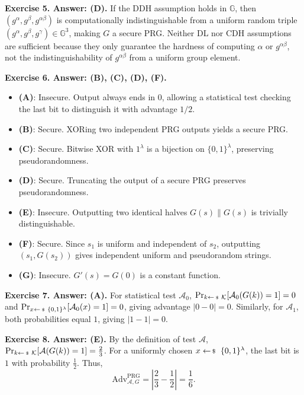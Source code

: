 \documentclass[../../book]{subfiles}
\begin{document}
\textbf{Exercise 5. Answer: (D).} If the DDH assumption holds in $\mathbb{G}$, then $(g^\alpha, g^\beta, g^{\alpha\beta})$ is computationally indistinguishable from a uniform random triple $(g^\alpha, g^\beta, g^\gamma) \in \mathbb{G}^3$, making $G$ a secure PRG. Neither DL nor CDH assumptions are sufficient because they only guarantee the hardness of computing $\alpha$ or $g^{\alpha\beta}$, not the indistinguishability of $g^{\alpha\beta}$ from a uniform group element.

\textbf{Exercise 6. Answer: (B), (C), (D), (F).}
\begin{itemize}
    \item \textbf{(A)}: Insecure. Output always ends in $0$, allowing a statistical test checking the last bit to distinguish it with advantage $1/2$.
    \item \textbf{(B)}: Secure. XORing two independent PRG outputs yields a secure PRG.
    \item \textbf{(C)}: Secure. Bitwise XOR with $1^\lambda$ is a bijection on $\{0,1\}^\lambda$, preserving pseudorandomness.
    \item \textbf{(D)}: Secure. Truncating the output of a secure PRG preserves pseudorandomness.
    \item \textbf{(E)}: Insecure. Outputting two identical halves $G(s) \parallel G(s)$ is trivially distinguishable.
    \item \textbf{(F)}: Secure. Since $s_1$ is uniform and independent of $s_2$, outputting $(s_1, G(s_2))$ gives independent uniform and pseudorandom strings.
    \item \textbf{(G)}: Insecure. $G'(s) = G(0)$ is a constant function.
\end{itemize}

\textbf{Exercise 7. Answer: (A).} For statistical test $\mathcal{A}_0$, $\Pr_{k \leftarrowS \mathcal{K}}[\mathcal{A}_0(G(k))=1] = 0$ and $\Pr_{x \leftarrowS \{0,1\}^\lambda}[\mathcal{A}_0(x)=1] = 0$, giving advantage $|0 - 0| = 0$. Similarly, for $\mathcal{A}_1$, both probabilities equal $1$, giving $|1 - 1| = 0$.

\textbf{Exercise 8. Answer: (E).} By the definition of test $\mathcal{A}$, $\Pr_{k \leftarrowS \mathcal{K}}[\mathcal{A}(G(k))=1] = \frac{2}{3}$. For a uniformly chosen $x \leftarrowS \{0,1\}^\lambda$, the last bit is $1$ with probability $\frac{1}{2}$. Thus,
\begin{equation*}
    \text{Adv}^{\text{PRG}}_{\mathcal{A},G} = \left| \frac{2}{3} - \frac{1}{2} \right| = \frac{1}{6}.
\end{equation*}
\end{document}
